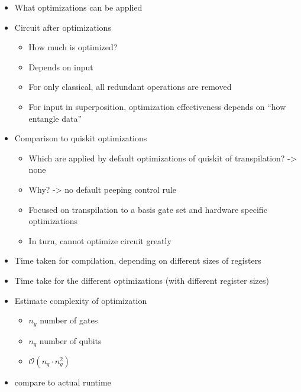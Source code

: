 \begin{itemize}
    \item What optimizations can be applied
    \item Circuit after optimizations
    \begin{itemize}
        \item How much is optimized?
        \item Depends on input
        \item For only classical, all redundant operations are removed
        \item For input in superposition, optimization effectiveness depends on ``how entangle data''
    \end{itemize}
    \item Comparison to quiskit optimizations
    \begin{itemize}
        \item Which are applied by default optimizations of quiskit of transpilation? -> none
        \item Why? -> no default peeping control rule
        \item Focused on transpilation to a basis gate set and hardware specific optimizations 
        \item In turn, cannot optimize circuit greatly
    \end{itemize}
\end{itemize}

\begin{itemize}
    \item Time taken for compilation, depending on different sizes of registers
    \item Time take for the different optimizations (with different register sizes)
    \item Estimate complexity of optimization
    \begin{itemize}
        \item $n_g$ number of gates
        \item $n_q$ number of qubits
        \item $\mathcal{O}(n_q \cdot n_g^2)$
    \end{itemize}
    \item compare to actual runtime
\end{itemize}


